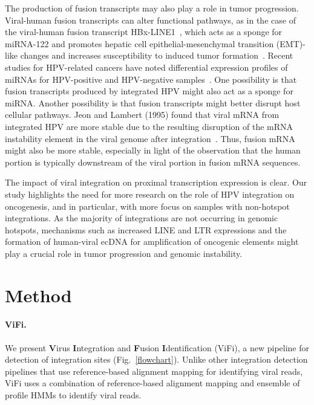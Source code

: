 \documentclass[10pt]{article}
\begin{document}
The production of fusion transcripts may also play a role in tumor progression.  Viral-human fusion transcripts can alter functional pathways, as in the case of the viral-human fusion transcript HBx-LINE1~\cite{Lau2014,Liang2016}, which acts as a sponge for miRNA-122 and promotes hepatic cell epithelial-mesenchymal transition (EMT)-like changes and increases susceptibility to induced tumor formation~\cite{Liang2016}.  Recent studies for HPV-related cancers have noted differential expression profiles of miRNAs for HPV-positive and HPV-negative samples~\cite{Lajer2012,Gao2016}.  One possibility is that fusion transcripts produced by integrated HPV might also act as a sponge for miRNA.  Another possibility is that fusion transcripts might better disrupt host cellular pathways.  Jeon and Lambert (1995) found that viral mRNA from integrated HPV are more stable due to the resulting disruption of the mRNA instability element in the viral genome after integration~\cite{Jeon1995}.  Thus, fusion mRNA might also be more stable, especially in light of the observation that the human portion is typically downstream of the viral portion in fusion mRNA sequences.  

The impact of viral integration on proximal transcription expression is clear.  Our study highlights the need for more research on the role of HPV integration on oncogenesis, and in particular, with more focus on samples with non-hotspot integrations.  As the majority of integrations are not occurring in genomic hotspots, mechanisms such as increased LINE and LTR expressions and the formation of human-viral ecDNA for amplification of oncogenic elements might play a crucial role in tumor progression and genomic instability.

 
\section*{Method}
\paragraph{\textbf{ViFi.}}
We present \textbf{V}irus \textbf{I}ntegration and \textbf{F}usion \textbf{I}dentification (ViFi), a new pipeline for detection of integration sites (Fig.~\ref{flowchart}).  Unlike other integration detection pipelines that use reference-based alignment mapping for identifying viral reads, ViFi uses a combination of reference-based alignment mapping and ensemble of profile HMMs to identify viral reads.  
\end{document}
